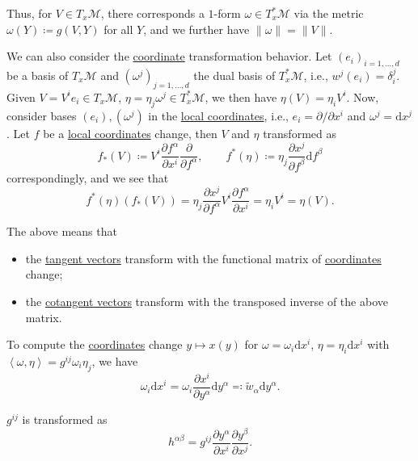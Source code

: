 Thus, for \(V\in T_x \mathcal{M} \), there corresponds a \(1\)-form \(\omega \in T_x ^{\ast} \mathcal{M} \) via the metric \(\omega (Y) \coloneqq g(V, Y)\) for all \(Y\), and we further have \(\lVert \omega \rVert = \lVert V \rVert \).

We can also consider the \hyperref[def:local-coordinate]{coordinate} transformation behavior. Let \((e_i)_{i=1, \dots , d}\) be a basis of \(T_x \mathcal{M} \) and \((\omega ^j)_{j=1, \dots , d}\) the dual basis of \(T_x ^{\ast} \mathcal{M} \), i.e., \(w^j(e_i)=\delta _i^j\). Given \(V = V^i e_i \in T_x \mathcal{M} \), \(\eta =\eta _j \omega ^j \in T_x^{\ast} \mathcal{M} \), we then have \(\eta (V) = \eta _i V^i\). Now, consider bases \((e_i), (\omega ^j)\) in the \hyperref[def:coordinate-chart]{local coordinates}, i.e., \(e_i = \partial / \partial x^i\) and \(\omega ^j = \mathrm{d} x^j\). Let \(f\) be a \hyperref[def:coordinate-chart]{local coordinates} change, then \(V\) and \(\eta \) transformed as
\[
	f_{\ast }(V) \coloneqq V^i \frac{\partial f^\alpha }{\partial x^i} \frac{\partial }{\partial f^\alpha },\qquad
	f^{\ast} (\eta ) \coloneqq \eta _j \frac{\partial x^j}{\partial f^\beta } \mathrm{d} f^\beta
\]
correspondingly, and we see that
\[
	f^{\ast} (\eta )(f_{\ast } (V))
	= \eta _j \frac{\partial x^j}{\partial f^\alpha } V^i \frac{\partial f^\alpha }{\partial x^i}
	= \eta _i V^i = \eta (V).
\]

\begin{intuition}
	The above means that
	\begin{itemize}
		\item the \hyperref[def:tangent-vector]{tangent vectors} transform with the functional matrix of \hyperref[def:coordinate-chart]{coordinates} change;
		\item the \hyperref[def:cotangent-vector]{cotangent vectors} transform with the transposed inverse of the above matrix.
	\end{itemize}
\end{intuition}

To compute the \hyperref[def:coordinate-chart]{coordinates} change \(y \mapsto x(y)\) for \(\omega = \omega _i \mathrm{d} x^i\), \(\eta = \eta _i \mathrm{d} x^i\) with \(\left\langle \omega , \eta \right\rangle = g^{ij} \omega _i \eta _j\), we have
\[
	\omega _i \mathrm{d} x^i
	= \omega _i \frac{\partial x^i}{\partial y^\alpha } \mathrm{d} y^\alpha
	\eqqcolon \widetilde{w} _\alpha \mathrm{d} y^\alpha.
\]

\begin{prev}
	\(g^{ij} \) is transformed as
	\[
		h^{\alpha \beta } = g^{ij} \frac{\partial y^\alpha }{\partial x^i} \frac{\partial y^\beta }{\partial x^j}.
	\]
\end{prev}

